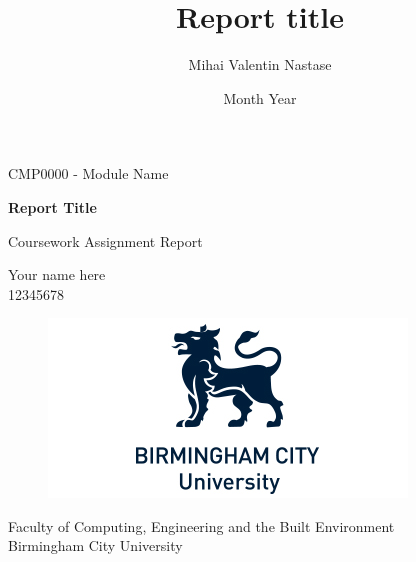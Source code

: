 \documentclass[12pt,a4paper]{article}
\title{Report title}
\author{Mihai Valentin Nastase}
\date{Month Year}
\newcommand{\moduleName}{CMP0000 - Module Name} %
\newcommand{\authorName}{Your name here}
\newcommand{\authorID}{12345678}
\newcommand{\reportTitle}{Report Title}
\begin{document}
\begin{titlepage}
   \begin{center}
       \moduleName
       \vspace*{0.5cm}

       \huge\textbf{\reportTitle} 

       \vspace{0.5cm}
        Coursework Assignment Report
            
       \vspace{1.5cm}

       \authorName \\
       \authorID


       \vfill
            
       \vspace{0.8cm}
     
       \begin{figure}[htp]
        \centering
        \includegraphics{logo}
        \end{figure}
            
       \large{Faculty of Computing, Engineering and the Built Environment \\
       Birmingham City University \\}
            
   \end{center}
\end{titlepage}
\pagestyle{fancy}
\fancyhf{}
\setlength{\headsep}{50pt}

\tableofcontents

\listoftables

\listoffigures
\end{document}
